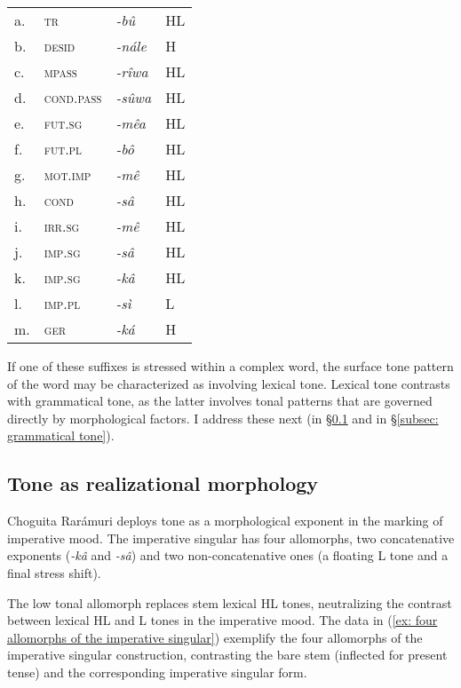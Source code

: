 \begin{tabular}{llll}
     a. & \textsc{tr} & \textit{-bû} & {HL}  \\
     b. & \textsc{desid} & \textit{-nále} & {H}\\
     c. &\textsc{mpass} & \textit{-rîwa} & {HL}\\
     d. & \textsc{cond.pass} &  \textit{-sûwa} & {HL}\\
     e. & \textsc{fut.sg} & \textit{-mêa} & {HL}{}\\
     f. & \textsc{fut.pl} & \textit{-bô} & {HL}{}\\
     g. & \textsc{mot.imp} & \textit{-mê} & {HL}{}\\
     h. & \textsc{cond} & \textit{-sâ}&{HL}{}\\
     i. & \textsc{irr.sg}& \textit{-mê}&{HL}{}\\
     j. & \textsc{imp.sg} &  \textit{-sâ} & {HL}{}\\
     k. & \textsc{imp.sg} & \textit{-kâ} & {HL}{}\\
     l. & \textsc{imp.pl} & \textit{-sì} &{L}\\
     m. & \textsc{ger} & \textit{-ká} & {H}\\
\end{tabular}
\z

If one of these suffixes is stressed within a complex word, the surface tone pattern of the word may be characterized as involving lexical tone. Lexical tone contrasts with grammatical tone, as the latter involves tonal patterns that are governed directly by morphological factors. I address these next (in §\ref{subsec: tone as realizational morphology} and in §\ref{subsec: grammatical tone}).

\subsection{Tone as realizational morphology}
\label{subsec: tone as realizational morphology}

Choguita Rarámuri deploys tone as a morphological exponent in the marking of imperative mood. The imperative singular has four allomorphs, two concatenative exponents (\textit{-kâ} and \textit{-sâ}) and two non-concatenative ones (a floating L tone and a final stress shift).

The low tonal allomorph replaces stem lexical HL tones, neutralizing the contrast between lexical HL and L tones in the imperative mood. The data in (\ref{ex: four allomorphs of the imperative singular}) exemplify the four allomorphs of the imperative singular construction, contrasting the bare stem (inflected for present tense) and the corresponding imperative singular form.

